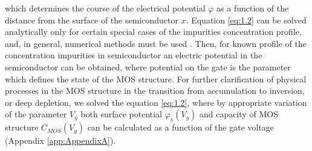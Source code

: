 \iffalse
ktorá určuje priebeh elektrického potenciálu $\varphi$ ako funkciu
vzdialenosti od povrchu polovodiča $x$. Rovnicu \ref{eq:1.2} možno
analyticky vyriešiť len pre určité špeciálne prípady priebehu
koncentrácie prímesí a vo všeobecnosti treba použiť numerické metódy
\cite{1.9,1.10}. Potom pre známy priebeh koncentrácie prímesí v
polovodiči možno získať priebeh elektrického potenciálu v polovodiči,
pričom napätie hradla považujeme za parameter, určujúci stav
štruktúry. Pre bližšie ozrejmenie fyzikálnych procesov v štruktúre MOS
pri prechode zo stavu akumulácie do inverzie, alebo hlbokého
ochudobnenia sme riešili rovnicu \ref{eq:1.2}, kde pri vhodnej
variácii parametra $V_g$ možno zároveň získať priebeh povrchového
potenciálu ako funkciu napätia hradla $\varphi_{s}(V_g)$ a závislosť
kapacity štruktúry MOS $C_{mos}(V_g)$ (Dodatok \ref{app:AppendixA}).
\fi

which determines the course of the electrical potential $\varphi$ as a
function of the distance from the surface of the semiconductor
$x$. Equation \ref{eq:1.2} can be solved analytically only for certain
special cases of the impurities concentration profile, and, in
general, numerical methods must be used \cite{1.9,1.10}. Then, for
known profile of the concentration impurities in semiconductor an
electric potential in the semiconductor can be obtained, where
potential on the gate is the parameter which defines the state of the
MOS structure. For further clarification of physical processes in the
MOS structure in the transition from accumulation to inversion, or
deep depletion, we solved the equation \ref{eq:1.2}, where by
appropriate variation of the parameter $V_g$ both surface potential
$\varphi_{s}(V_g)$ and capacity of MOS structure $C_{MOS}(V_g)$ can
be calculated as a function of the gate voltage (Appendix
\ref{app:AppendixA}).

